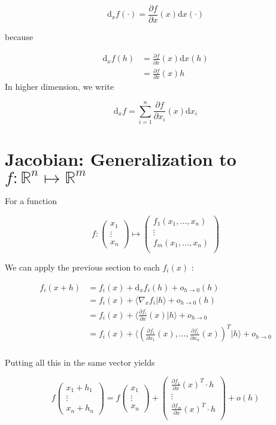 \documentclass{tufte-handout}
\newcommand{\ud}{\mathrm{d}}
\begin{document}
$$ \ud_x f (\cdot) =  \frac{\partial f}{\partial x}(x) \ud x (\cdot) $$

because 

\begin{align*}
\ud_x f (h) &=  \frac{\partial f}{\partial x}(x)  \ud x (h) \\
&= \frac{\partial f}{\partial x}(x)  h 
\end{align*}
In higher dimension, we write 

$$ \ud_x f = \sum_{i=1}^n \frac{\partial f}{\partial x_i}(x) \ud x_i $$

\section{\textbf{Jacobian}: Generalization to $ f: \mathbb{R}^n \mapsto \mathbb{R}^m $ }
\label{sec:gen}
For a function

$$ f: 
\begin{pmatrix}
x_1\\
\vdots\\
x_n
\end{pmatrix} \mapsto 
\begin{pmatrix}
f_1(x_1, \ldots, x_n)\\
\vdots\\
f_m(x_1, \ldots, x_n)\\
\end{pmatrix}
$$

We can apply the previous section to each $ f_i(x) $ : 

\begin{align*}
f_i(x+h) &= f_i(x) + \ud_x f_i(h) + o_{h \rightarrow 0} (h) \\
&= f_i(x) +  \langle \nabla_x f_i | h \rangle  + o_{h \rightarrow 0} (h)\\
&= f_i(x) +  \langle \frac{\partial f_i}{\partial x}(x) | h \rangle  + o_{h \rightarrow 0}\\
&= f_i(x) +  \langle (\frac{\partial f_i}{\partial x_1}(x), \ldots,  \frac{\partial f_i}{\partial x_n}(x))^T | h \rangle + o_{h \rightarrow 0}\\
\end{align*}

Putting all this in the same vector yields

$$ f \begin{pmatrix}
x_1 + h_1\\
\vdots\\
x_n + h_n
\end{pmatrix} = f
\begin{pmatrix}
x_1\\
\vdots\\
x_n
\end{pmatrix} + 
\begin{pmatrix}
\frac{\partial f_1}{\partial x}(x)^T \cdot h\\
\vdots\\
\frac{\partial f_m}{\partial x}(x)^T \cdot h\\
\end{pmatrix} + o(h)
$$ 
\end{document}
